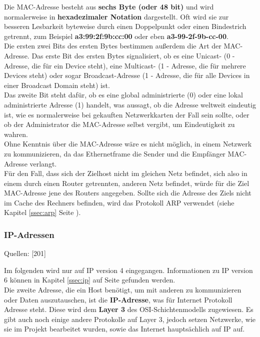 \documentclass[12pt,a4paper]{report}
\begin{document}
\begin{onehalfspace}
Die MAC-Adresse besteht aus \textbf{sechs Byte (oder 48 bit)} und wird normalerweise in \textbf{hexadezimaler Notation} dargestellt. Oft wird sie zur besseren Lesbarkeit byteweise durch einen Doppelpunkt oder einen Bindestrich getrennt, zum Beispiel \textbf{a3:99:2f:9b:cc:00} oder eben \textbf{a3-99-2f-9b-cc-00}.\\

Die ersten zwei Bits des ersten Bytes bestimmen außerdem die Art der MAC-Adresse. Das erste Bit des ersten Bytes signalisiert, ob es eine Unicast- (0 - Adresse, die für ein Device steht), eine Multicast-   (1 - Adresse, die für mehrere Devices steht) oder sogar Broadcast-Adresse (1 - Adresse, die für alle Devices in einer Broadcast Domain steht) ist.\\
Das zweite Bit steht dafür, ob es eine global administrierte (0) oder eine lokal administrierte Adresse (1) handelt, was aussagt, ob die Adresse weltweit eindeutig ist, wie es normalerweise bei gekauften Netzwerkkarten der Fall sein sollte, oder ob der Administrator die MAC-Adresse selbst vergibt, um Eindeutigkeit zu wahren.\\

Ohne Kenntnis über die MAC-Adresse wäre es nicht möglich, in einem Netzwerk zu kommunizieren, da das Ethernetframe die Sender und die Empfänger MAC-Adresse verlangt.\\
Für den Fall, dass sich der Zielhost nicht im gleichen Netz befindet, sich also in einem durch einen Router getrennten, anderen Netz befindet, würde für die Ziel MAC-Adresse jene des Routers angegeben. Sollte sich die Adresse des Ziels nicht im Cache des Rechners befinden, wird das Protokoll ARP verwendet (siehe Kapitel \ref{ssec:arp} Seite \pageref{ssec:arp}). 
\subsubsection{IP-Adressen}\label{sssec:ipaddr}
\begin{flushright}
\begin{tiny}
Quellen: [201]
\end{tiny}
\end{flushright}
Im folgenden wird nur auf IP version 4 eingegangen. Informationen zu IP version 6 können in Kapitel \ref{ssec:ip} auf Seite \pageref{ssec:ip} gefunden werden.\\

Die zweite Adresse, die ein Host benötigt, um mit anderen zu kommunizieren oder Daten auszutauschen, ist die \textbf{IP-Adresse}, was für Internet Protokoll Adresse steht. Diese wird dem \textbf{Layer 3} des OSI-Schichtenmodells zugewiesen. Es gibt auch noch einige andere Protokolle auf Layer 3, jedoch setzen Netzwerke, wie sie im Projekt bearbeitet wurden, sowie das Internet hauptsächlich auf IP auf.\\


\end{onehalfspace}
\end{document}

